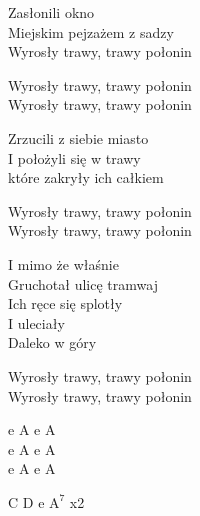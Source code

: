 \begin{text}
    Zasłonili okno\\
    Miejskim pejzażem z sadzy\\
    Wyrosły trawy, trawy połonin

    \vin Wyrosły trawy, trawy połonin\\
    \vin Wyrosły trawy, trawy połonin

    Zrzucili z siebie miasto\\
    I położyli się w trawy\\
    które zakryły ich całkiem

    Wyrosły trawy, trawy połonin\\
    Wyrosły trawy, trawy połonin

    I mimo że właśnie\\
    Gruchotał ulicę tramwaj\\
    Ich ręce się splotły\\
    I uleciały\\
    Daleko w góry

    Wyrosły trawy, trawy połonin\\
    Wyrosły trawy, trawy połonin
\end{text}
\begin{chord}
    e A e A\\
    e A e A\\
    e A e A

    C D e $\mathrm{A^7}$ x2
\end{chord}
